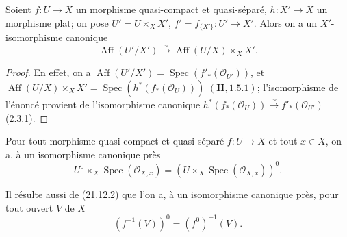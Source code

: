 \begin{proposition}[21.12.2]
\label{IV.21.12.2}
Soient $f:U\to X$ un morphisme quasi-compact et quasi-séparé,
$h:X'\to X$ un morphisme plat; on pose $U'=U\times_X X'$,
$f'=f_{\{X'\}}:U'\to X'$. Alors on a un $X'$-isomorphisme canonique
\[
\label{IV.21.12.2.1}
  \operatorname{Aff}(U'/X')\xrightarrow{\sim}
  \operatorname{Aff}(U/X)\times_X X'.
  \tag{21.12.2.1}
\]
\end{proposition}

\begin{proof}
En effet, on a
$\operatorname{Aff}(U'/X')=\operatorname{Spec}(f'_*(\mathcal O_{U'}))$, et
$\operatorname{Aff}(U/X)\times_X X'=\operatorname{Spec}(h^*(f_*(\mathcal O_U)))$
$(\mathbf{II}, 1.5.1)$; l'isomorphisme de l'énoncé provient de l'isomorphisme canonique
$h^*(f_*(\mathcal O_U))\xrightarrow{\sim}f'_*(\mathcal O_{U'})$ (2.3.1).
\end{proof}

\begin{corollary}[21.12.3]
\label{IV.21.12.3}
Pour tout morphisme quasi-compact et quasi-séparé $f:U\to X$ et tout $x\in X$, on a,
à un isomorphisme canonique près
\[
  U^0\times_X\operatorname{Spec}(\mathcal O_{X,x})
  =(U\times_X\operatorname{Spec}(\mathcal O_{X,x}))^0.
\]
\end{corollary}

Il résulte aussi de (21.12.2) que l'on a, à un isomorphisme canonique près, pour tout
ouvert $V$ de $X$
\[
\label{IV.21.12.4}
  (f^{-1}(V))^0=(f^0)^{-1}(V).
  \tag{21.12.4}
\]

